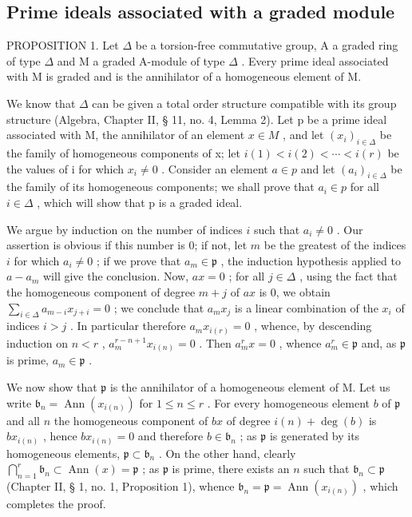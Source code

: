 \subsection{Prime ideals associated with a graded module}

PROPOSITION 1. Let \(\Delta\) be a torsion-free commutative group, A a graded ring of type \(\Delta\) and M a graded A-module of type \(\Delta\) . Every prime ideal associated with M is graded and is the annihilator of a homogeneous element of M.

We know that \(\Delta\) can be given a total order structure compatible with its group structure (Algebra, Chapter II, § 11, no. 4, Lemma 2). Let p be a prime ideal associated with M, the annihilator of an element \(x \in M\) , and let \((x_{i})_{i \in \Delta}\) be the family of homogeneous components of x; let \(i(1) < i(2) < \cdots < i(r)\) be the values of i for which \(x_{i} \neq 0\) . Consider an element \(a \in p\) and let \((a_{i})_{i \in \Delta}\) be the family of its homogeneous components; we shall prove that \(a_{i} \in p\) for all \(i \in \Delta\) , which will show that p is a graded ideal.

We argue by induction on the number of indices \(i\) such that \(a_{i} \neq 0\) . Our assertion is obvious if this number is 0; if not, let \(m\) be the greatest of the indices \(i\) for which \(a_{i} \neq 0\) ; if we prove that \(a_{m} \in \mathfrak{p}\) , the induction hypothesis applied to \(a - a_{m}\) will give the conclusion. Now, \(ax = 0\) ; for all \(j \in \Delta\) , using the fact that the homogeneous component of degree \(m + j\) of \(ax\) is 0, we obtain \(\sum_{i \in \Delta} a_{m - i} x_{j + i} = 0\) ; we conclude that \(a_{m} x_{j}\) is a linear combination of the \(x_{i}\) of indices \(i > j\) . In particular therefore \(a_{m} x_{i(r)} = 0\) , whence, by descending induction on \(n < r\) , \(a_{m}^{r - n + 1} x_{i(n)} = 0\) . Then \(a_{m}^{r} x = 0\) , whence \(a_{m}^{r} \in \mathfrak{p}\) and, as \(\mathfrak{p}\) is prime, \(a_{m} \in \mathfrak{p}\) .

We now show that \(\mathfrak{p}\) is the annihilator of a homogeneous element of M. Let us write \(\mathfrak{b}_n = \operatorname{Ann}(x_{i(n)})\) for \(1 \leqslant n \leqslant r\) . For every homogeneous element \(b\) of \(\mathfrak{p}\) and all \(n\) the homogeneous component of \(bx\) of degree \(i(n) + \deg(b)\) is \(bx_{i(n)}\) , hence \(bx_{i(n)} = 0\) and therefore \(b \in \mathfrak{b}_n\) ; as \(\mathfrak{p}\) is generated by its homogeneous elements, \(\mathfrak{p} \subset \mathfrak{b}_n\) . On the other hand, clearly \(\bigcap_{n=1}^{r} \mathfrak{b}_n \subset \operatorname{Ann}(x) = \mathfrak{p}\) ; as \(\mathfrak{p}\) is prime, there exists an \(n\) such that \(\mathfrak{b}_n \subset \mathfrak{p}\) (Chapter II, § 1, no. 1, Proposition 1), whence \(\mathfrak{b}_n = \mathfrak{p} = \operatorname{Ann}(x_{i(n)})\) , which completes the proof.

